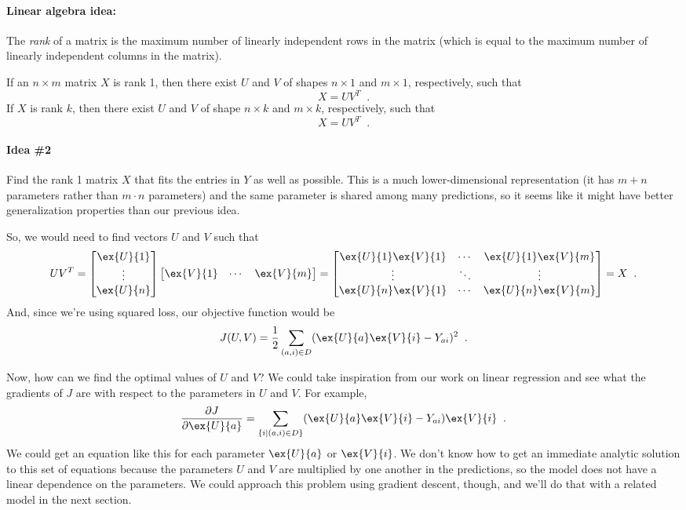 \begin{examplebox}
  \paragraph*{Linear algebra idea:}
  The \emph{rank} of a matrix is the maximum number of linearly independent
  rows in the matrix (which is equal to the maximum number of linearly
  independent columns in the matrix).

  If an $n \times m$ matrix $X$ is rank 1, then there exist $U$ and $V$ of
  shapes $n \times 1$ and $m \times 1$, respectively, such that
  \[X = UV^T\;\;.\]
  If $X$ is rank $k$, then there exist $U$ and $V$ of shape $n \times k$
  and $m \times k$, respectively, such that
  \[X = UV^T\;\;.\]
\end{examplebox}

\paragraph*{Idea \#2}
Find the rank 1 matrix $X$ that fits the entries in $Y$ as well as
possible.   This is a much lower-dimensional representation (it has $m
  + n$ parameters rather than $m \cdot n$ parameters) and the same
parameter is shared among many predictions, so it seems like it might
have better generalization properties than our previous idea.

So, we would need to find vectors $U$ and $V$ such that
\[
  UV^T
  =
  \begin{bmatrix}
    \ex{U}{1} \\ \vdots \\ \ex{U}{n}
  \end{bmatrix}
  \begin{bmatrix}
    \ex{V}{1} & \cdots & \ex{V}{m}
  \end{bmatrix}
  =
  \begin{bmatrix}
    \ex{U}{1}\ex{V}{1} & \cdots & \ex{U}{1}\ex{V}{m} \\
    \vdots             & \ddots & \vdots             \\
    \ex{U}{n}\ex{V}{1} & \cdots & \ex{U}{n}\ex{V}{m} \\
  \end{bmatrix}
  =
  X \;\;.
\]
And, since we're using squared loss, our objective function would be
\[
  J(U,V) = \frac{1}{2}
  \sum_{(a,i)\in D}(\ex{U}{a}\ex{V}{i} - Y_{ai})^2 \;\;.
\]

Now, how can we find the optimal values of $U$ and $V$?  We could take
inspiration from our work on linear regression and see what the
gradients of $J$ are with respect to the parameters in $U$ and $V$.
For example,
\[
  \frac{\partial J}{\partial \ex{U}{a}} = \sum_{\{i \mid (a,i) \in D\}}
  (\ex{U}{a}\ex{V}{i} - Y_{ai})\ex{V}{i} \;\;.
\]
We could get an equation like this for each parameter $\ex{U}{a}$ or
$\ex{V}{i}$.  We don't know how to get an immediate analytic solution
to this set of equations because the parameters $U$ and $V$ are
multiplied by one another in the predictions, so the model does not
have a linear dependence on the parameters.  We could approach this
problem using gradient descent, though, and we'll do that with a
related model in the next section.

